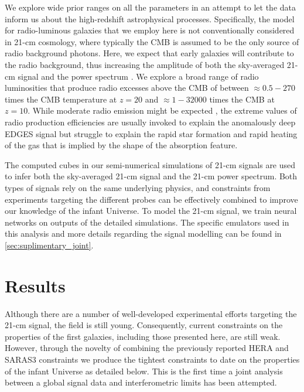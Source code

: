 We explore wide prior ranges on all the parameters in an attempt to let the data inform us about the high-redshift astrophysical processes. Specifically, the model for radio-luminous galaxies that we employ here is not conventionally considered in 21-cm cosmology, where typically the CMB is assumed to be the only source of radio background photons. Here, we expect that early galaxies will contribute to the radio background, thus increasing the amplitude of both the sky-averaged 21-cm signal \cite{FengRB2018} and the power spectrum \cite{Fialkov2019, Reis2020}. We explore a broad range of radio luminosities that produce radio excesses above the CMB of between $\approx0.5 - 270$ times the CMB temperature at $z=20$ and $\approx1 - 32000$ times the CMB at $z=10$. While moderate radio emission might be expected \cite{MirochaRB2019}, the extreme values of radio production efficiencies are usually invoked to explain the anomalously deep EDGES signal \cite{Bowman_edges_2018, FengRB2018, JanaRB2018, EwallRB2018, MirochaRB2019, Fialkov2019, Reis2020} but struggle to explain the rapid star formation and rapid heating of the gas \cite{Mittal2022} that is implied by the shape of the absorption feature.

The computed cubes in our semi-numerical simulations of 21-cm signals are used to infer both the sky-averaged 21-cm signal and the 21-cm power spectrum. Both types of signals rely on the same underlying physics, and constraints from experiments targeting the different probes can be effectively combined to improve our knowledge of the infant Universe. To model the 21-cm signal, we train neural networks on outputs of the detailed simulations. The specific emulators used in this analysis and more details regarding the signal modelling can be found in \cref{sec:suplimentary_joint}.

\section{Results} \label{sec:results_joint}

Although there are a number of well-developed experimental efforts targeting the 21-cm signal, the field is still young. Consequently, current constraints on the properties of the first galaxies, including those presented here, are still weak. However, through the novelty of combining the previously reported HERA and SARAS3 constraints we produce the tightest constraints to date on the properties of the infant Universe as detailed below. This is the first time a joint analysis between a global signal data and interferometric limits has been attempted.

